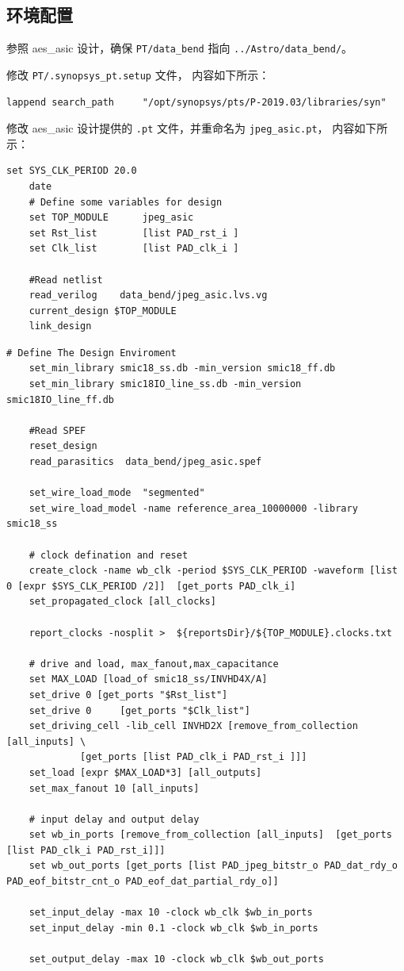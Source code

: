 \documentclass[12pt,hyperref,a4paper,UTF8]{ctexart}
\begin{document}
\subsection{环境配置}
参照 aes\_asic 设计，确保 \texttt{PT/data\_bend} 指向
 \texttt{../Astro/data\_bend/}。
 
修改 \texttt{PT/.synopsys\_pt.setup} 文件，
内容如下所示：

\begin{lstlisting}[style=tclstyle,name=.synopsys_pt.setup]
    lappend search_path     "/opt/synopsys/pts/P-2019.03/libraries/syn"
\end{lstlisting}

修改 aes\_asic 设计提供的 \texttt{.pt} 文件，并重命名为 \texttt{jpeg\_asic.pt}，
内容如下所示：
\begin{lstlisting}[style=tclstyle,name=jpeg_asic.pt]
    set SYS_CLK_PERIOD 20.0
    date
    # Define some variables for design
    set TOP_MODULE		jpeg_asic
    set Rst_list		[list PAD_rst_i ]
    set Clk_list		[list PAD_clk_i ]

    #Read netlist
    read_verilog	data_bend/jpeg_asic.lvs.vg
    current_design $TOP_MODULE
    link_design
\end{lstlisting}
\newpage
\begin{lstlisting}[style=tclstyle,name=jpeg_asic.pt]
    # Define The Design Enviroment
    set_min_library smic18_ss.db -min_version smic18_ff.db
    set_min_library smic18IO_line_ss.db -min_version smic18IO_line_ff.db

    #Read SPEF
    reset_design
    read_parasitics  data_bend/jpeg_asic.spef 

    set_wire_load_mode  "segmented"
    set_wire_load_model -name reference_area_10000000 -library smic18_ss

    # clock defination and reset
    create_clock -name wb_clk -period $SYS_CLK_PERIOD -waveform [list 0 [expr $SYS_CLK_PERIOD /2]]  [get_ports PAD_clk_i]
    set_propagated_clock [all_clocks]

    report_clocks -nosplit >  ${reportsDir}/${TOP_MODULE}.clocks.txt

    # drive and load, max_fanout,max_capacitance
    set MAX_LOAD [load_of smic18_ss/INVHD4X/A]
    set_drive 0	[get_ports "$Rst_list"]
    set_drive 0 	[get_ports "$Clk_list"]
    set_driving_cell -lib_cell INVHD2X [remove_from_collection [all_inputs] \
             [get_ports [list PAD_clk_i PAD_rst_i ]]]
    set_load [expr $MAX_LOAD*3] [all_outputs]
    set_max_fanout 10 [all_inputs]

    # input delay and output delay
    set wb_in_ports [remove_from_collection [all_inputs]  [get_ports [list PAD_clk_i PAD_rst_i]]]
    set wb_out_ports [get_ports [list PAD_jpeg_bitstr_o PAD_dat_rdy_o PAD_eof_bitstr_cnt_o PAD_eof_dat_partial_rdy_o]]

    set_input_delay -max 10 -clock wb_clk $wb_in_ports
    set_input_delay -min 0.1 -clock wb_clk $wb_in_ports

    set_output_delay -max 10 -clock wb_clk $wb_out_ports

\end{lstlisting}
\end{document}
